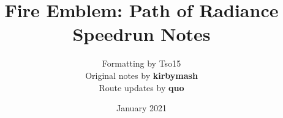 \documentclass[a4paper]{report}
\title{Fire Emblem: Path of Radiance Speedrun Notes}
\author{Formatting by Tso15
\\ Original notes by \textbf{kirbymash}
\\ Route updates by \textbf{quo}}
\date{January 2021}
\begin{document}
\singlespacing
\maketitle
\makeatletter
\patchcmd{\chapter}{\if@openright\cleardoublepage\else\clearpage\fi}{}{}{}
\makeatother


\newenvironment{battlespecial}[1]{\begin{tcolorbox}[title=\begin{center}#1\end{center},colbacktitle=blue!50!white]}{\end{tcolorbox}}
\newenvironment{battle}[1]{\refstepcounter{chaptercount} \begin{tcolorbox}[title=\begin{center}Chapter \thechaptercount\ - #1\end{center},colbacktitle=blue!50!white]}{\end{tcolorbox}}


\newcommand{\battleinfo}[3]{Goal: \ifthenelse{\equal{#1}{rout}}{Rout the Enemy}{\ifthenelse{\equal{#1}{boss}}{Defeat the Boss}{#1}} \newline Turns: #2 \newline Units: #3}


\newenvironment{shop}[1]{\begin{tcolorbox}[title=\begin{center}SHOP\, #1 GOLD\end{center},colbacktitle=green!50!white]}{\end{tcolorbox}}

\newcommand{\cs}[1][]{\textbf{CS}%
	\ifthenelse{\isempty{#1}}{}{ (#1)}%
}

\end{document}
